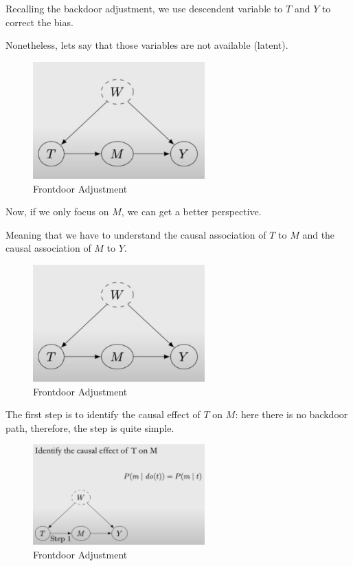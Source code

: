 \documentclass{article}
\begin{document}
Recalling the backdoor adjustment, we use descendent variable to $T$ and $Y$ to correct the bias.

Nonetheless, lets say that those variables are not available (latent).

\begin{figure}[H]
  \centering
  \includegraphics[width=250px]{draft-photos/frontdoor_adjustment_explained.png}
  \caption{Frontdoor Adjustment}
  \label{fig:frontdoor_adjustment_explained}
\end{figure}

Now, if we only focus on $M$, we can get a better perspective.

Meaning that we have to understand the causal association of $T$ to $M$ and the causal association of $M$ to $Y$.

\begin{figure}[H]
  \centering
  \includegraphics[width=250px]{draft-photos/frontdoor_adjustment_explained.png}
  \caption{Frontdoor Adjustment}
  \label{fig:frontdoor_adjustment_solution}
\end{figure}

The first step is to identify the causal effect of $T$ on $M$: here there is no backdoor path, therefore, the step is quite simple.

\begin{figure}[H]
  \centering
  \includegraphics[width=250px]{draft-photos/frontdoor_adjustment_explanation.png}
  \caption{Frontdoor Adjustment}
  \label{fig:frontdoor_adjustment_explanation}
\end{figure}
\end{document}
